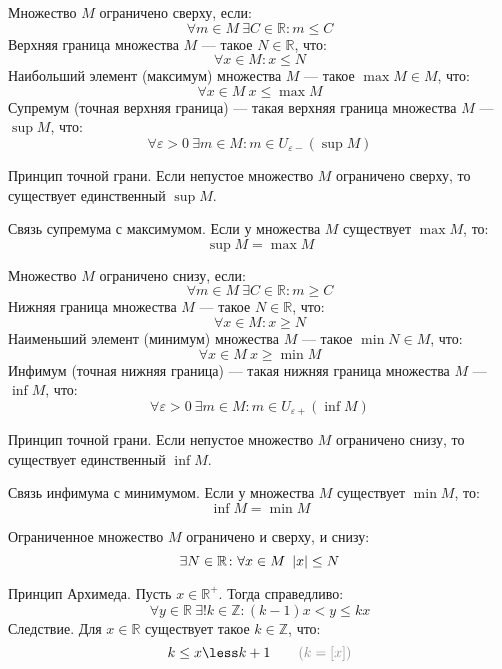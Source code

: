 Множество $M$ {\bold ограничено сверху}, если:
$$\forall m\in M\ \exists C\in\mathbb{R}\colon m\leq C$$
{\bold Верхняя граница} множества $M$ --- такое $N\in\mathbb{R}$, что:
$$\forall x\in M\colon x\leq N$$
{\bold Наибольший элемент} {\ital (максимум)} множества $M$ --- такое $\max M\in M$, что:
$$\forall x\in M\ x\leq\max M$$
{\bold Супремум} {\ital (точная верхняя граница)} --- такая верхняя граница множества $M$ --- $\sup M$, что:
$$\forall\varepsilon\greater 0\ \exists m\in M\colon m\in U_{\varepsilon-}(\sup M)$$
\begin{theorem}
{\bold Принцип точной грани.} Если непустое множество $M$ ограничено сверху, то существует {\ital единственный} $\sup M$.
\end{theorem}
\begin{theorem}
{\bold Связь супремума с максимумом.} Если у множества $M$ существует $\max M$, то:
$$\sup M=\max M$$ 
\end{theorem}
Множество $M$ {\bold ограничено снизу}, если:
$$\forall m\in M\ \exists C\in\mathbb{R}\colon m\geq C$$
{\bold Нижняя граница} множества $M$ --- такое $N\in\mathbb{R}$, что:
$$\forall x\in M\colon x\geq N$$
{\bold Наименьший элемент} {\ital (минимум)} множества $M$ --- такое $\min N\in M$, что:
$$\forall x\in M\ x\geq\min M$$
{\bold Инфимум} {\ital (точная нижняя граница)} --- такая нижняя граница множества $M$ --- $\inf M$, что:
$$\forall\varepsilon\greater 0\ \exists m\in M\colon m\in U_{\varepsilon+}(\inf M)$$
\begin{theorem}
{\bold Принцип точной грани.} Если непустое множество $M$ ограничено снизу, то существует {\ital единственный} $\inf M$.
\end{theorem}
\begin{theorem}
{\bold Связь инфимума с минимумом.} Если у множества $M$ существует $\min M$, то:
$$\inf M=\min M$$ 
\end{theorem}
{\bold Ограниченное} множество $M$ ограничено {\ital и сверху, и снизу}:
$$\exists N\in\mathbb{R}\colon\forall x\in M\ \abs{x}\leq N$$
\begin{theorem}
{\bold Принцип Архимеда.} Пусть $x\in\mathbb{R}^+$. Тогда справедливо:
$$\forall y\in\mathbb{R}\ \exists!k\in\mathbb{Z}\colon (k-1)x\less y\leq kx$$
{\bold Следствие.} Для $x\in\mathbb{R}$ существует такое $k\in\mathbb{Z}$, что:
$$k\leq x\less k+1\qquad{\color{desc} (k=[x])}$$
\end{theorem}
